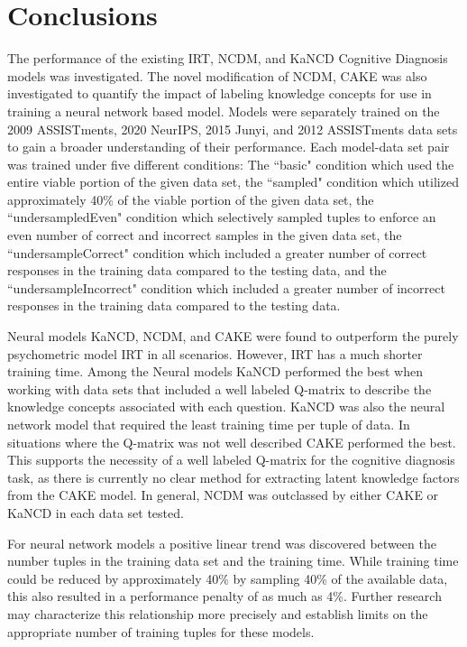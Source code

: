 \documentclass[letterpaper, 12pt, captions=tableabove]{scrreprt}
\begin{document}
\chapter{Conclusions}
\label{ch:conclusions}
	
	The performance of the existing IRT, NCDM, and KaNCD Cognitive Diagnosis models was investigated. The novel modification of NCDM, CAKE was also investigated to quantify the impact of labeling knowledge concepts for use in training a neural network based model. Models were separately trained on the 2009 ASSISTments, 2020 NeurIPS, 2015 Junyi, and 2012 ASSISTments data sets to gain a broader understanding of their performance. Each model-data set pair was trained under five different conditions: The ``basic" condition which used the entire viable portion of the given data set, the ``sampled" condition which utilized approximately 40\% of the viable portion of the given data set, the ``undersampledEven" condition which selectively sampled tuples to enforce an even number of correct and incorrect samples in the given data set, the ``undersampleCorrect" condition which included a greater number of correct responses in the training data compared to the testing data, and the ``undersampleIncorrect" condition which included a greater number of incorrect responses in the training data compared to the testing data. 

	Neural models KaNCD, NCDM, and CAKE were found to outperform the purely psychometric model IRT in all scenarios. However, IRT has a much shorter training time. Among the Neural models KaNCD performed the best when working with data sets that included a well labeled Q-matrix to describe the knowledge concepts associated with each question. KaNCD was also the neural network model that required the least training time per tuple of data. In situations where the Q-matrix was not well described CAKE performed the best. This supports the necessity of a well labeled Q-matrix for the cognitive diagnosis task, as there is currently no clear method for extracting latent knowledge factors from the CAKE model. In general, NCDM was outclassed by either CAKE or KaNCD in each data set tested. 

For neural network models a positive linear trend was discovered between the number tuples in the training data set and the training time. While training time could be reduced by approximately 40\%  by sampling 40\% of the available data, this also resulted in a performance penalty of as much as 4\%. Further research may characterize this relationship more precisely  and establish limits on the appropriate number of training tuples for these models.
\end{document}
